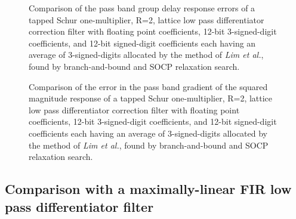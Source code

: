\documentclass[a4paper,twoside,10pt,english]{article}
\newcommand{\DesignOfSchurLatticeFiltersPdfScale}{1}
\begin{document}
\begin{figure}
\centering
\scalebox{\DesignOfSchurLatticeFiltersPdfScale}{}
\caption{Comparison of the pass band group delay response errors of a tapped
  Schur one-multiplier, R=2, lattice low pass differentiator correction filter
  with floating point coefficients, 12-bit 3-signed-digit coefficients, and
  12-bit signed-digit coefficients each having an average of 3-signed-digits
  allocated by the method of \emph{Lim et al.}, found by branch-and-bound and
  SOCP relaxation search.}
\label{fig:Comp-schurOneMlattice-lowpass-diff-R2-12-nbits-delay}
\end{figure}

\begin{figure}
\centering
\scalebox{\DesignOfSchurLatticeFiltersPdfScale}{}
\caption{Comparison of the error in the pass band gradient of the squared
  magnitude response of a tapped Schur one-multiplier, R=2, lattice low pass
  differentiator correction filter with floating point coefficients, 12-bit
  3-signed-digit coefficients, and 12-bit signed-digit coefficients each having
  an average of 3-signed-digits allocated by the method of \emph{Lim et al.},
  found by branch-and-bound and SOCP relaxation search.}
\label{fig:Comp-schurOneMlattice-lowpass-diff-R2-12-nbits-dCsqdw}
\end{figure}

\subsection{Comparison with a maximally-linear  FIR low pass differentiator filter}
\end{document}
